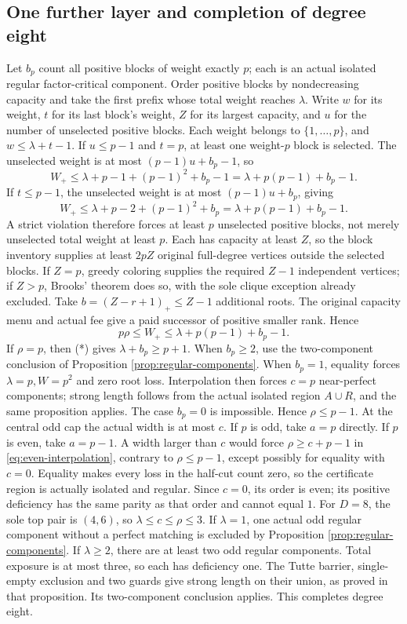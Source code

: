 \documentclass[11pt,a4paper]{article}
\theoremstyle{definition}
\begin{document}
\subsection{One further layer and completion of degree eight}
Let $b_p$ count all positive blocks of weight exactly $p$; each is an actual isolated regular factor-critical component. Order positive blocks by nondecreasing capacity and take the first prefix whose total weight reaches $\lambda$. Write $w$ for its weight, $t$ for its last block's weight, $Z$ for its largest capacity, and $u$ for the number of unselected positive blocks. Each weight belongs to $\{1,\ldots,p\}$, and $w\le\lambda+t-1$.
If $u\le p-1$ and $t=p$, at least one weight-$p$ block is selected. The unselected weight is at most $(p-1)u+b_p-1$, so
\[
W_+\le\lambda+p-1+(p-1)^2+b_p-1
=\lambda+p(p-1)+b_p-1.
\]
If $t\le p-1$, the unselected weight is at most $(p-1)u+b_p$, giving
\[
W_+\le\lambda+p-2+(p-1)^2+b_p
=\lambda+p(p-1)+b_p-1.
\]
A strict violation therefore forces at least $p$ unselected positive blocks, not merely unselected total weight at least $p$. Each has capacity at least $Z$, so the block inventory supplies at least $2pZ$ original full-degree vertices outside the selected blocks. If $Z=p$, greedy coloring supplies the required $Z-1$ independent vertices; if $Z>p$, Brooks' theorem does so, with the sole clique exception already excluded. Take $b=(Z-r+1)_+\le Z-1$ additional roots. The original capacity menu and actual fee give a paid successor of positive smaller rank. Hence
\[
p\rho\le W_+\le\lambda+p(p-1)+b_p-1.\tag{*}
\]
If $\rho=p$, then (*) gives $\lambda+b_p\ge p+1$. When $b_p\ge2$, use the two-component conclusion of Proposition \ref{prop:regular-components}. When $b_p=1$, equality forces $\lambda=p,W=p^2$ and zero root loss. Interpolation then forces $c=p$ near-perfect components; strong length follows from the actual isolated region $A\cup R$, and the same proposition applies. The case $b_p=0$ is impossible. Hence $\rho\le p-1$.
At the central odd cap the actual width is at most $c$. If $p$ is odd, take $a=p$ directly. If $p$ is even, take $a=p-1$. A width larger than $c$ would force $\rho\ge c+p-1$ in \eqref{eq:even-interpolation}, contrary to $\rho\le p-1$, except possibly for equality with $c=0$. Equality makes every loss in the half-cut count zero, so the certificate region is actually isolated and regular. Since $c=0$, its order is even; its positive deficiency has the same parity as that order and cannot equal $1$.
For $D=8$, the sole top pair is $(4,6)$, so $\lambda\le c\le\rho\le3$. If $\lambda=1$, one actual odd regular component without a perfect matching is excluded by Proposition \ref{prop:regular-components}. If $\lambda\ge2$, there are at least two odd regular components. Total exposure is at most three, so each has deficiency one. The Tutte barrier, single-empty exclusion and two guards give strong length on their union, as proved in that proposition. Its two-component conclusion applies. This completes degree eight.
\end{document}
